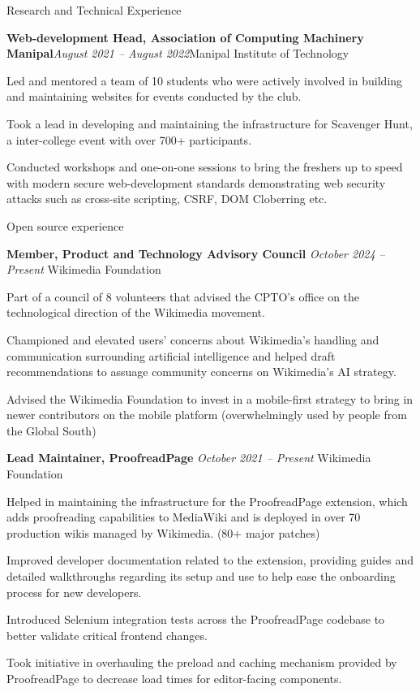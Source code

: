 \documentclass{resume} %
\begin{document}
\begin{rSection}{Research and Technical Experience}
\begin{rSubsection}{\bf Web-development Head, Association of Computing Machinery Manipal}{\em August 2021 -- August 2022}{Manipal Institute of Technology}{}
\item Led and mentored a team of 10 students who were actively involved in building and maintaining websites for events conducted by the club.
\item Took a lead in developing and maintaining the infrastructure for Scavenger Hunt, a inter-college event with over 700+ participants.
\item Conducted workshops and one-on-one sessions to bring the freshers up to speed with modern secure web-development standards demonstrating web security attacks such as cross-site scripting, CSRF, DOM Cloberring etc.
\end{rSubsection}
\end{rSection}
\begin{rSection}{Open source experience}
\begin{rSubsection}{ \bf Member, Product and Technology Advisory Council}{ \em October 2024 -- Present }{Wikimedia Foundation}{}
\item Part of a council of 8 volunteers that advised the CPTO's office on the technological direction of the Wikimedia movement.
\item Championed and elevated users' concerns about Wikimedia's handling and communication surrounding artificial intelligence and helped draft recommendations to assuage community concerns on Wikimedia's AI strategy.
\item Advised the Wikimedia Foundation to invest in a mobile-first strategy to bring in newer contributors on the mobile platform (overwhelmingly used by people from the Global South)
\end{rSubsection}
\begin{rSubsection}{ \bf Lead Maintainer, ProofreadPage}{ \em October 2021 -- Present }{Wikimedia Foundation}{}
\item Helped in maintaining the infrastructure for the ProofreadPage extension, which adds proofreading capabilities to MediaWiki and is deployed in over 70 production wikis managed by Wikimedia. (80+ major patches)
\item Improved developer documentation related to the extension, providing guides and detailed walkthroughs regarding its setup and use to help ease the onboarding process for new developers.
\item Introduced Selenium integration tests across the ProofreadPage codebase to better validate critical frontend changes.
\item Took initiative in overhauling the preload and caching mechanism provided by ProofreadPage to decrease load times for editor-facing components.

\end{rSubsection}
\end{rSection}
\end{document}
